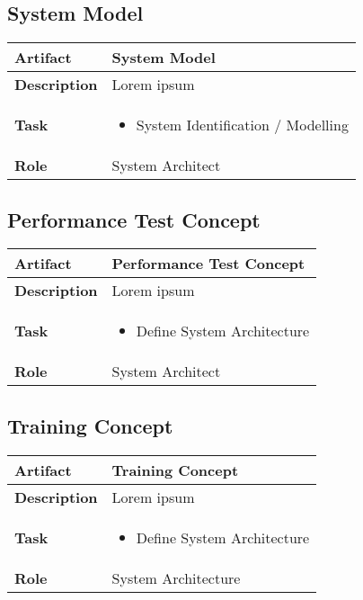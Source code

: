 \subsection{System Model}
\begin{minipage}{\textwidth}
 \label{table:ch6_Artifact_System_Model}
\begin{tabular}
	{|m{2cm}|m{10cm}|} \hline \bfseries Artifact & System Model\\
	\hline \bfseries Description & Lorem ipsum\\
	\hline \bfseries Task & 
	\begin{itemize}
		\item System Identification / Modelling
	\end{itemize}
	\\
	\hline \bfseries Role & System Architect\\
	\hline 
\end{tabular}
\end{minipage}

\subsection{Performance Test Concept}
\begin{minipage}{\textwidth}
 \label{table:ch6_Artifact_Performance_Test_Concept}
\begin{tabular}
	{|m{2cm}|m{10cm}|} \hline \bfseries Artifact & Performance Test Concept\\
	\hline \bfseries Description & Lorem ipsum\\
	\hline \bfseries Task & 
	\begin{itemize}
		\item Define System Architecture 
	\end{itemize}
	\\
	\hline \bfseries Role & System Architect\\
	\hline 
\end{tabular}
\end{minipage}

\subsection{Training Concept}
\begin{minipage}{\textwidth}
 \label{table:ch6_Artifact_Training_Concept}
\begin{tabular}
	{|m{2cm}|m{10cm}|} \hline \bfseries Artifact & Training Concept\\
	\hline \bfseries Description & Lorem ipsum\\
	\hline \bfseries Task & 
	\begin{itemize}
		\item Define System Architecture 
	\end{itemize}
	\\
	\hline \bfseries Role & System Architecture\\
	\hline 
\end{tabular}
\end{minipage}

